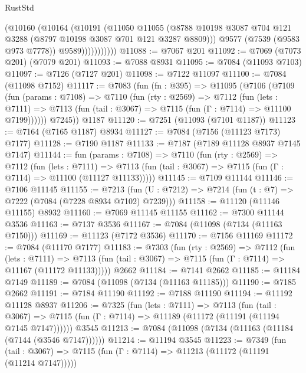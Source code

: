 \begin{lexlean}{RustStd}
\begin{coremodule}
                    (@10160
                      (@10164
                        (@10191
                          (@11050
                            @11055
                            (@8788
                              @10198
                              @3087
                              @704
                              @121
                              @3288
                              (@8797 @10198 @3087 @701 @121 @3287 @8809)))
                          @9577
                          (@7539 (@9583 @973 @7778))
                          @9589)))))))))))
@11088 := @7067 @201
@11092 := @7069 (@7073 @201) (@7079 @201)
@11093 := @7088 @8931
@11095 := @7084 (@11093 @7103)
@11097 := @7126 (@7127 @201)
@11098 := @7122 @11097
@11100 := @7084 (@11098 @7152)
@11117 := @7083
    (fun (fn : @395) =>
    @11095
      (@7106
        (@7109
          (fun (params : @7108) =>
          @7110
            (fun (rty : @2569) =>
            @7112
              (fun (lets : @7111) =>
              @7113 (fun (tail : @3067) => @7115 (fun (Γ : @7114) => @11100 @7199))))))
        @7245))
    @1187
@11120 := @7251 (@11093 (@7101 @1187))
@11123 := @7164 (@7165 @1187) @8934
@11127 := @7084 (@7156 (@11123 @7173) @7177)
@11128 := @7190 @1187
@11133 := @7187 (@7189 @11128 @8937 @7145 @7147)
@11144 := fun (params : @7108) =>
  @7110
    (fun (rty : @2569) =>
    @7112
      (fun (lets : @7111) =>
      @7113 (fun (tail : @3067) => @7115 (fun (Γ : @7114) => @11100 (@11127 @11133)))))
@11145 := @7109 @11144
@11146 := @7106 @11145
@11155 := @7213 (fun (U : @7212) => @7214 (fun (t : @7) => @7222 (@7084 (@7228 @8934 @7102) @7239)))
@11158 := @11120 (@11146 @11155) @8932
@11160 := @7069 @11145 @11155
@11162 := @7300 @11144 @3536
@11163 := @7137 @3536
@11167 := @7084 (@11098 (@7134 (@11163 @7150)))
@11169 := @11123 (@7172 @3536)
@11170 := @7156 @11169
@11172 := @7084 (@11170 @7177)
@11183 := @7303
    (fun (rty : @2569) =>
    @7112
      (fun (lets : @7111) =>
      @7113 (fun (tail : @3067) => @7115 (fun (Γ : @7114) => @11167 (@11172 @11133)))))
    @2662
@11184 := @7141 @2662
@11185 := @11184 @7149
@11189 := @7084 (@11098 (@7134 (@11163 @11185)))
@11190 := @7185 @2662
@11191 := @7184 @11190
@11192 := @7188 @11190
@11194 := @11192 @11128 @8937
@11206 := @7325
    (fun (lets : @7111) =>
    @7113
      (fun (tail : @3067) =>
      @7115 (fun (Γ : @7114) => @11189 (@11172 (@11191 (@11194 @7145 @7147))))))
    @3545
@11213 := @7084 (@11098 (@7134 (@11163 (@11184 (@7144 (@3546 @7147))))))
@11214 := @11194 @3545
@11223 := @7349
    (fun (tail : @3067) => @7115 (fun (Γ : @7114) => @11213 (@11172 (@11191 (@11214 @7147)))))

\end{coremodule}
\end{lexlean}
